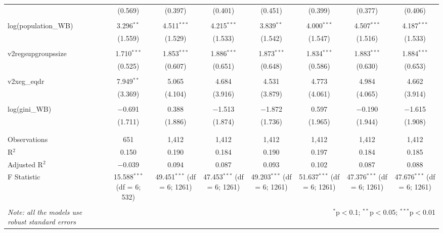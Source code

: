 \documentclass[a4paper, 12pt]{article}
\begin{document}
\begin{landscape}
\begin{table}[!htbp]
{\begin{tabular}{@{\extracolsep{5pt}}lccccccc}
  & (0.569) & (0.397) & (0.401) & (0.451) & (0.399) & (0.377) & (0.406) \\ 
  & & & & & & & \\ 
 log(population\_WB) & 3.296$^{**}$ & 4.511$^{***}$ & 4.215$^{***}$ & 3.839$^{**}$ & 4.000$^{***}$ & 4.507$^{***}$ & 4.187$^{***}$ \\ 
  & (1.559) & (1.529) & (1.533) & (1.542) & (1.547) & (1.516) & (1.533) \\ 
  & & & & & & & \\ 
 v2regsupgroupssize & 1.710$^{***}$ & 1.853$^{***}$ & 1.886$^{***}$ & 1.873$^{***}$ & 1.834$^{***}$ & 1.883$^{***}$ & 1.884$^{***}$ \\ 
  & (0.525) & (0.607) & (0.651) & (0.648) & (0.586) & (0.630) & (0.653) \\ 
  & & & & & & & \\ 
 v2xeg\_eqdr & 7.949$^{**}$ & 5.065 & 4.684 & 4.531 & 4.773 & 4.984 & 4.662 \\ 
  & (3.369) & (4.104) & (3.916) & (3.879) & (4.061) & (4.065) & (3.914) \\ 
  & & & & & & & \\ 
 log(gini\_WB) & $-$0.691 & 0.388 & $-$1.513 & $-$1.872 & 0.597 & $-$0.190 & $-$1.615 \\ 
  & (1.711) & (1.886) & (1.874) & (1.736) & (1.965) & (1.944) & (1.908) \\ 
  & & & & & & & \\ 
\hline \\[-1.8ex] 
Observations & 651 & 1,412 & 1,412 & 1,412 & 1,412 & 1,412 & 1,412 \\ 
R$^{2}$ & 0.150 & 0.190 & 0.184 & 0.190 & 0.197 & 0.184 & 0.185 \\ 
Adjusted R$^{2}$ & $-$0.039 & 0.094 & 0.087 & 0.093 & 0.102 & 0.087 & 0.088 \\ 
F Statistic & 15.588$^{***}$ (df = 6; 532) & 49.451$^{***}$ (df = 6; 1261) & 47.453$^{***}$ (df = 6; 1261) & 49.203$^{***}$ (df = 6; 1261) & 51.637$^{***}$ (df = 6; 1261) & 47.376$^{***}$ (df = 6; 1261) & 47.676$^{***}$ (df = 6; 1261) \\ 
\hline 
\hline \\[-1.8ex] 
\textit{Note: all the models use robust standard errors}  & \multicolumn{7}{r}{$^{*}$p$<$0.1; $^{**}$p$<$0.05; $^{***}$p$<$0.01} \\ 
\end{tabular} }
\end{table} 

\end{landscape}
\end{document}
